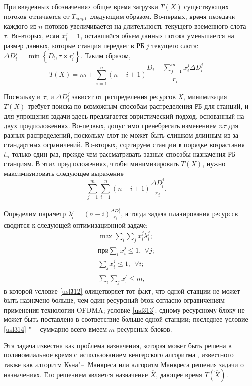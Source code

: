При введенных обозначениях общее время загрузки $T\left(X\right)$ существующих потоков отличается от $T_{step1}$ следующим образом. Во-первых, время передачи каждого из  $n$ потоков увеличивается на длительность текущего временного слота $\tau$. 
Во-вторых, если $x_i^j=1$, оставшийся объем данных потока  уменьшается на размер данных, которые станция передает в РБ $j$ текущего слота: $\Delta D_i^j = \min\left\{D_i, \tau \times r_{i}^{j}\right\}$.
Таким образом,
\[ T\left(X\right) = n \tau + \sum_{i = 1}^{n} \left(n - i + 1\right) \frac{D_i -  \sum_{j = 1}^{m} x_i^j \Delta D_i^j}{r_{i}} \]

Поскольку и $\tau$, и  $\Delta D_i^j$ зависят от распределения ресурсов $X$, минимизация $T(X)$ требует поиска по возможным способам распределения РБ для станций, и для упрощения задачи здесь предлагается эвристический подход, основанный на двух предположениях. 
Во-первых, допустимо пренебрегать изменением $n \tau$ для разных распределений, поскольку слот не может быть слишком длинным из-за стандартных ограничений. 
Во-вторых, сортируем станции в порядке возрастания $t_n$ только один раз, прежде чем рассматривать разные способы назначения РБ станциям. 
В этих предположениях, чтобы минимизировать $T(X)$, нужно максимизировать следующее выражение 
$$\sum_{j = 1}^{m} \sum_{i = 1}^{n } \left(n - i + 1\right) \frac{\Delta D_i^j}{r_{i}}.$$

Определим параметр $\lambda_i^j = \left(n - i\right) \frac{\Delta D_i^j}{r_{i}}$, и тогда задача планирования ресурсов сводится к следующей оптимизационной задаче:
\begin{align} 
\max \sum_{i} \sum_{j} x_i^j \lambda_i^j; \\ \label{usl312}
\text{при} \sum_{i} x_i^j \leq 1,\ \  \forall j; \\ \label{usl313}
\sum_{j} x_i^j \leq 1, \ \ \forall i; \\ \label{usl314}
\sum_{i} \sum_{j} x_i^j \leq m,
\end{align}
в которой условие \eqref{usl312} олицетворяет тот факт, что одной станции не может быть назначено больше, чем один ресурсный блок согласно ограничениям применения технологии OFDMA; условие \eqref{usl313}: одному ресурсному блоку не может быть поставлено в соответствие больше одной станции; последнее условие \eqref{usl314} "--- суммарно всего имеем $m$ ресурсных блоков.

Эта задача известна как проблема назначения, которая может быть решена в полиномиальное время с использованием венгерского алгоритма \cite{bourgeois1971extension}, известного также как алгоритм Куна"--~Манкреса или алгоритм Манкреса решения задачи о назначениях. 
Его решением является назначение $\hat X$, дающее время $T(\hat X)$. 

